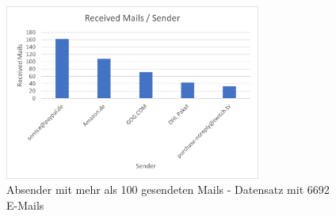 \begin{figure}
    \centering
    \includegraphics[width=0.75\textwidth]{images/Merged_Auswertung_Empfange_Emails.png}
    \caption{Absender mit mehr als 100 gesendeten Mails - Datensatz mit 6692 E-Mails} 
    \label{fig:receivedemailsmerged}
\end{figure}